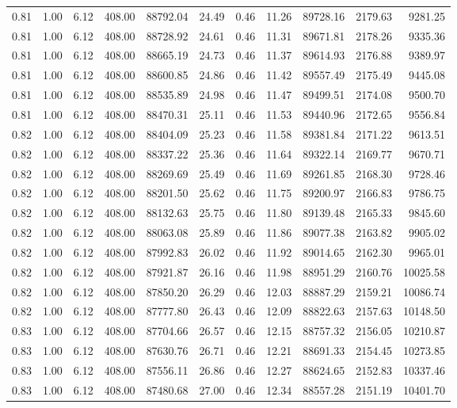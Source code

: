 \begin{table}[!ht]
\begin{tabular}{rrrrrrrrrrr}
0.81 & 1.00 & 6.12 & 408.00 & 88792.04 & 24.49 & 0.46 & 11.26 & 89728.16 & 2179.63 & 9281.25 \\
0.81 & 1.00 & 6.12 & 408.00 & 88728.92 & 24.61 & 0.46 & 11.31 & 89671.81 & 2178.26 & 9335.36 \\
0.81 & 1.00 & 6.12 & 408.00 & 88665.19 & 24.73 & 0.46 & 11.37 & 89614.93 & 2176.88 & 9389.97 \\
0.81 & 1.00 & 6.12 & 408.00 & 88600.85 & 24.86 & 0.46 & 11.42 & 89557.49 & 2175.49 & 9445.08 \\
0.81 & 1.00 & 6.12 & 408.00 & 88535.89 & 24.98 & 0.46 & 11.47 & 89499.51 & 2174.08 & 9500.70 \\
0.81 & 1.00 & 6.12 & 408.00 & 88470.31 & 25.11 & 0.46 & 11.53 & 89440.96 & 2172.65 & 9556.84 \\
0.82 & 1.00 & 6.12 & 408.00 & 88404.09 & 25.23 & 0.46 & 11.58 & 89381.84 & 2171.22 & 9613.51 \\
0.82 & 1.00 & 6.12 & 408.00 & 88337.22 & 25.36 & 0.46 & 11.64 & 89322.14 & 2169.77 & 9670.71 \\
0.82 & 1.00 & 6.12 & 408.00 & 88269.69 & 25.49 & 0.46 & 11.69 & 89261.85 & 2168.30 & 9728.46 \\
0.82 & 1.00 & 6.12 & 408.00 & 88201.50 & 25.62 & 0.46 & 11.75 & 89200.97 & 2166.83 & 9786.75 \\
0.82 & 1.00 & 6.12 & 408.00 & 88132.63 & 25.75 & 0.46 & 11.80 & 89139.48 & 2165.33 & 9845.60 \\
0.82 & 1.00 & 6.12 & 408.00 & 88063.08 & 25.89 & 0.46 & 11.86 & 89077.38 & 2163.82 & 9905.02 \\
0.82 & 1.00 & 6.12 & 408.00 & 87992.83 & 26.02 & 0.46 & 11.92 & 89014.65 & 2162.30 & 9965.01 \\
0.82 & 1.00 & 6.12 & 408.00 & 87921.87 & 26.16 & 0.46 & 11.98 & 88951.29 & 2160.76 & 10025.58 \\
0.82 & 1.00 & 6.12 & 408.00 & 87850.20 & 26.29 & 0.46 & 12.03 & 88887.29 & 2159.21 & 10086.74 \\
0.82 & 1.00 & 6.12 & 408.00 & 87777.80 & 26.43 & 0.46 & 12.09 & 88822.63 & 2157.63 & 10148.50 \\
0.83 & 1.00 & 6.12 & 408.00 & 87704.66 & 26.57 & 0.46 & 12.15 & 88757.32 & 2156.05 & 10210.87 \\
0.83 & 1.00 & 6.12 & 408.00 & 87630.76 & 26.71 & 0.46 & 12.21 & 88691.33 & 2154.45 & 10273.85 \\
0.83 & 1.00 & 6.12 & 408.00 & 87556.11 & 26.86 & 0.46 & 12.27 & 88624.65 & 2152.83 & 10337.46 \\
0.83 & 1.00 & 6.12 & 408.00 & 87480.68 & 27.00 & 0.46 & 12.34 & 88557.28 & 2151.19 & 10401.70 \\

\end{tabular}
\end{table}
